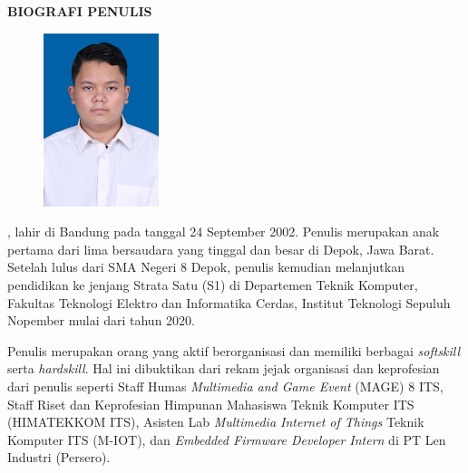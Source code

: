 \begin{center}
  \Large
  \textbf{BIOGRAFI PENULIS}
\end{center}


\vspace{2ex}

\begin{figure}
  \centering
  \vspace{-3ex}
  \includegraphics[width=0.3\textwidth]{gambar/evan.jpg}
  \vspace{-4ex}
\end{figure}

\name{}, lahir di Bandung pada tanggal 24 September 2002. Penulis merupakan anak pertama dari lima bersaudara yang tinggal dan besar di Depok, Jawa Barat. Setelah lulus dari SMA Negeri 8 Depok, penulis kemudian melanjutkan pendidikan ke jenjang Strata Satu (S1) di Departemen Teknik Komputer, Fakultas Teknologi Elektro dan Informatika Cerdas, Institut Teknologi Sepuluh Nopember mulai dari tahun 2020. 

Penulis merupakan orang yang aktif berorganisasi dan memiliki berbagai \emph{softskill} serta \emph{hardskill}. Hal ini dibuktikan dari rekam jejak organisasi dan keprofesian dari penulis seperti Staff Humas \emph{Multimedia and Game Event} (MAGE) 8 ITS, Staff Riset dan Keprofesian Himpunan Mahasiswa Teknik Komputer ITS (HIMATEKKOM ITS), Asisten Lab \emph{Multimedia Internet of Things} Teknik Komputer ITS (M-IOT), dan \emph{Embedded Firmware Developer Intern} di PT Len Industri (Persero).
